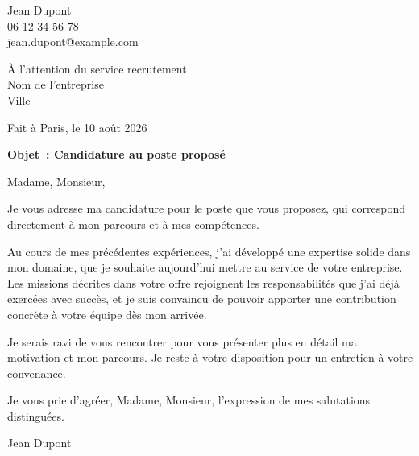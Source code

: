 \documentclass[a4paper,11pt]{article}
\begin{document}
Jean Dupont \\
06 12 34 56 78 \\
jean.dupont@example.com

\vspace{1.5cm}

À l'attention du service recrutement \\
Nom de l'entreprise \\
Ville

\vspace{0.5cm}

Fait à Paris, le 10 août 2026

\vspace{0.5cm}

\textbf{Objet~: Candidature au poste proposé}

\vspace{0.5cm}

Madame, Monsieur,

Je vous adresse ma candidature pour le poste que vous proposez, qui correspond directement à mon parcours et à mes compétences.

Au cours de mes précédentes expériences, j'ai développé une expertise solide dans mon domaine, que je souhaite aujourd'hui mettre au service de votre entreprise. Les missions décrites dans votre offre rejoignent les responsabilités que j'ai déjà exercées avec succès, et je suis convaincu de pouvoir apporter une contribution concrète à votre équipe dès mon arrivée.

Je serais ravi de vous rencontrer pour vous présenter plus en détail ma motivation et mon parcours. Je reste à votre disposition pour un entretien à votre convenance.

Je vous prie d'agréer, Madame, Monsieur, l'expression de mes salutations distinguées.

\vspace{1cm}

Jean Dupont
\end{document}
